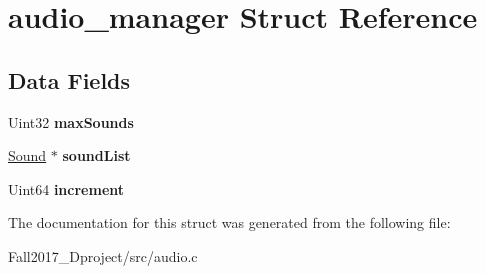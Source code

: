 \hypertarget{structaudio__manager}{}\section{audio\+\_\+manager Struct Reference}
\label{structaudio__manager}
\subsection*{Data Fields}
\begin{DoxyCompactItemize}
\item 
\mbox{\label{structaudio__manager_ab75ce519cd6dd16c6d1307703b09a7cd}} 
Uint32 {\bfseries max\+Sounds}
\item 
\mbox{\label{structaudio__manager_aadd5a1903ca098aeb0e6677a2b1a68db}} 
\hyperlink{structsound__s}{Sound} $\ast$ {\bfseries sound\+List}
\item 
\mbox{\label{structaudio__manager_ab08657e2d8ce2eb598d448722ef0959b}} 
Uint64 {\bfseries increment}
\end{DoxyCompactItemize}


The documentation for this struct was generated from the following file\+:\begin{DoxyCompactItemize}
\item 
Fall2017\+\_\+Dproject/src/audio.\+c\end{DoxyCompactItemize}
